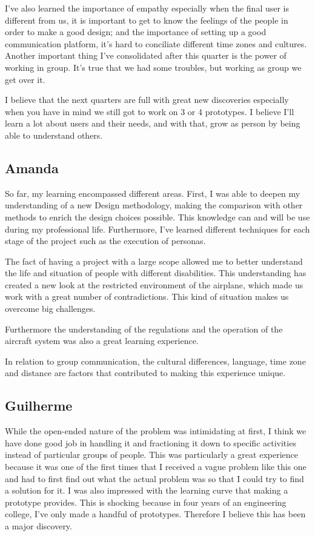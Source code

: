 I’ve also learned the importance of empathy especially when the final user is different from us, it is important to get to know the feelings of the people in order to make a good design; and the importance of setting up a good communication platform, it’s hard to conciliate different time zones and cultures. Another important thing I’ve consolidated after this quarter is the power of working in group. It’s true that we had some troubles, but working as group we get over it.

I believe that the next quarters are full with great new discoveries especially when you have in mind we still got to work on 3 or 4 prototypes. I believe I’ll learn a lot about users and their needs, and with that, grow as person by being able to understand others.

\subsection{Amanda}
So far, my learning encompassed different areas. First, I was able to deepen my understanding of a new Design methodology, making the comparison with other methods to enrich the design choices possible. This knowledge can and will be use during my professional life. Furthermore, I’ve learned different techniques for each stage of the project such as the execution of personas.

The fact of having a project with a large scope allowed me to better understand the life and situation of people with different disabilities. This understanding has created a new look at the restricted environment of the airplane, which made us work with a great number of contradictions. This kind of situation makes us overcome big challenges.

Furthermore the understanding of the regulations and the operation of the aircraft system was also a great learning experience.

In relation to group communication, the cultural differences, language, time zone and distance are factors that contributed to making this experience unique.    

\subsection{Guilherme}
While the open-ended nature of the problem was intimidating at first, I think we have done good job in handling it and fractioning it down to specific activities instead of particular groups of people. This was particularly a great experience because it was one of the first times that I received a vague problem like this one and had to first find out what the actual problem was so that I could try to find a solution for it. I was also impressed with the learning curve that making a prototype provides. This is shocking because in four years of an engineering college, I’ve only made a handful of prototypes. Therefore I believe this has been a major discovery.

